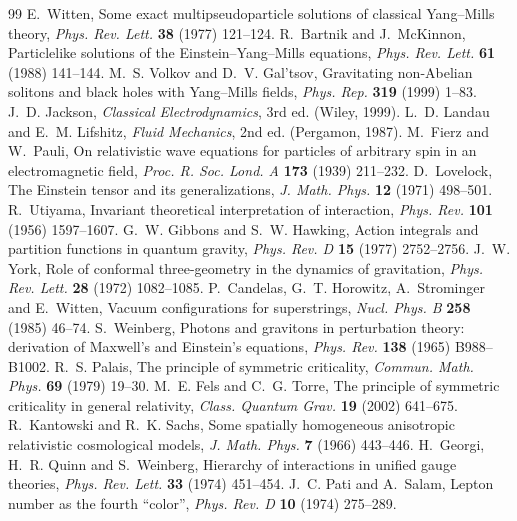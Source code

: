 \begin{thebibliography}{99}
 E.~Witten, Some exact multipseudoparticle solutions of classical Yang--Mills theory, \emph{Phys. Rev. Lett.} \textbf{38} (1977) 121--124.
 R.~Bartnik and J.~McKinnon, Particlelike solutions of the Einstein--Yang--Mills equations, \emph{Phys. Rev. Lett.} \textbf{61} (1988) 141--144.
 M.~S. Volkov and D.~V. Gal'tsov, Gravitating non-Abelian solitons and black holes with Yang--Mills fields, \emph{Phys. Rep.} \textbf{319} (1999) 1--83.
 J.~D. Jackson, \emph{Classical Electrodynamics}, 3rd ed. (Wiley, 1999).
 L.~D. Landau and E.~M. Lifshitz, \emph{Fluid Mechanics}, 2nd ed. (Pergamon, 1987).
 M.~Fierz and W.~Pauli, On relativistic wave equations for particles of arbitrary spin in an electromagnetic field, \emph{Proc. R. Soc. Lond. A} \textbf{173} (1939) 211--232.
 D.~Lovelock, The Einstein tensor and its generalizations, \emph{J. Math. Phys.} \textbf{12} (1971) 498--501.
 R.~Utiyama, Invariant theoretical interpretation of interaction, \emph{Phys. Rev.} \textbf{101} (1956) 1597--1607.
 G.~W. Gibbons and S.~W. Hawking, Action integrals and partition functions in quantum gravity, \emph{Phys. Rev. D} \textbf{15} (1977) 2752--2756.
 J.~W. York, Role of conformal three-geometry in the dynamics of gravitation, \emph{Phys. Rev. Lett.} \textbf{28} (1972) 1082--1085.
 P.~Candelas, G.~T. Horowitz, A.~Strominger and E.~Witten, Vacuum configurations for superstrings, \emph{Nucl. Phys. B} \textbf{258} (1985) 46--74.
 S.~Weinberg, Photons and gravitons in perturbation theory: derivation of Maxwell's and Einstein's equations, \emph{Phys. Rev.} \textbf{138} (1965) B988--B1002.
 R.~S. Palais, The principle of symmetric criticality, \emph{Commun. Math. Phys.} \textbf{69} (1979) 19--30.
 M.~E. Fels and C.~G. Torre, The principle of symmetric criticality in general relativity, \emph{Class. Quantum Grav.} \textbf{19} (2002) 641--675.
 R.~Kantowski and R.~K. Sachs, Some spatially homogeneous anisotropic relativistic cosmological models, \emph{J. Math. Phys.} \textbf{7} (1966) 443--446.
 H.~Georgi, H.~R. Quinn and S.~Weinberg, Hierarchy of interactions in unified gauge theories, \emph{Phys. Rev. Lett.} \textbf{33} (1974) 451--454.
 J.~C. Pati and A.~Salam, Lepton number as the fourth ``color'', \emph{Phys. Rev. D} \textbf{10} (1974) 275--289.

\end{thebibliography}
